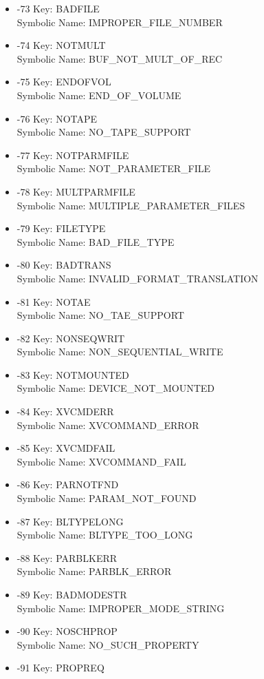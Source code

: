 \begin{itemize}
\item -73 Key: BADFILE \\
Symbolic Name: IMPROPER\_FILE\_NUMBER
\item -74 Key: NOTMULT \\
Symbolic Name: BUF\_NOT\_MULT\_OF\_REC
\item -75 Key: ENDOFVOL \\
Symbolic Name: END\_OF\_VOLUME
\item -76 Key: NOTAPE \\
Symbolic Name: NO\_TAPE\_SUPPORT
\item -77 Key: NOTPARMFILE \\
Symbolic Name: NOT\_PARAMETER\_FILE
\item -78 Key: MULTPARMFILE \\
Symbolic Name: MULTIPLE\_PARAMETER\_FILES
\item -79 Key: FILETYPE \\
Symbolic Name: BAD\_FILE\_TYPE
\item -80 Key: BADTRANS \\
Symbolic Name: INVALID\_FORMAT\_TRANSLATION
\item -81 Key: NOTAE \\
Symbolic Name: NO\_TAE\_SUPPORT
\item -82 Key: NONSEQWRIT \\
Symbolic Name: NON\_SEQUENTIAL\_WRITE
\item -83 Key: NOTMOUNTED \\
Symbolic Name: DEVICE\_NOT\_MOUNTED
\item -84 Key: XVCMDERR \\
Symbolic Name: XVCOMMAND\_ERROR
\item -85 Key: XVCMDFAIL \\
Symbolic Name: XVCOMMAND\_FAIL
\item -86 Key: PARNOTFND \\
Symbolic Name: PARAM\_NOT\_FOUND
\item -87 Key: BLTYPELONG \\
Symbolic Name: BLTYPE\_TOO\_LONG
\item -88 Key: PARBLKERR \\
Symbolic Name: PARBLK\_ERROR
\item -89 Key: BADMODESTR \\
Symbolic Name: IMPROPER\_MODE\_STRING
\item -90 Key: NOSCHPROP \\
Symbolic Name: NO\_SUCH\_PROPERTY
\item -91 Key: PROPREQ \\

\end{itemize}
